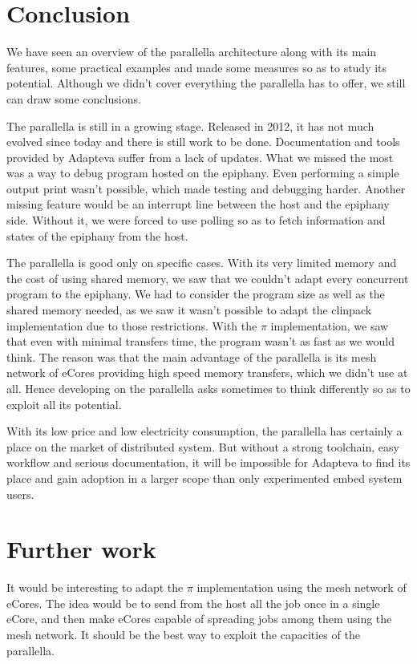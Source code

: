 \section{Conclusion}

We have seen an overview of the parallella architecture along with its main features, some practical examples and made some measures so as to study its potential. Although we didn't cover everything the parallella has to offer, we still can draw some conclusions.

The parallella is still in a growing stage. Released in 2012, it has not much evolved since today and there is still work to be done. Documentation and tools provided by Adapteva suffer from a lack of updates. What we missed the most was a way to debug program hosted on the \gls{epiphany}. Even performing a simple output print wasn't possible, which made testing and debugging harder. Another missing feature would be an interrupt line between the host and the \gls{epiphany} side. Without it, we were forced to use polling so as to fetch information and states of the \gls{epiphany} from the host.

The parallella is good only on specific cases. With its very limited memory and the cost of using shared memory, we saw that we couldn't adapt every concurrent program to the \gls{epiphany}. We had to consider the program size as well as the shared memory needed, as we saw it wasn't possible to adapt the clinpack implementation due to those restrictions. With the $\pi$ implementation, we saw that even with minimal transfers time, the program wasn't as fast as we would think. The reason was that the main advantage of the parallella is its mesh network of \glspl{eCore} providing high speed memory transfers, which we didn't use at all. Hence developing on the parallella asks sometimes to think differently so as to exploit all its potential.

With its low price and low electricity consumption, the parallella has certainly a place on the market of distributed system. But without a strong toolchain, easy workflow and serious documentation, it will be impossible for Adapteva to find its place and gain adoption in a larger scope than only experimented embed system users.

\section{Further work}

It would be interesting to adapt the $\pi$ implementation using the mesh network of \glspl{eCore}. The idea would be to send from the host all the job once in a single \gls{eCore}, and then make \glspl{eCore} capable of spreading jobs among them using the mesh network. It should be the best way to exploit the capacities of the parallella.

